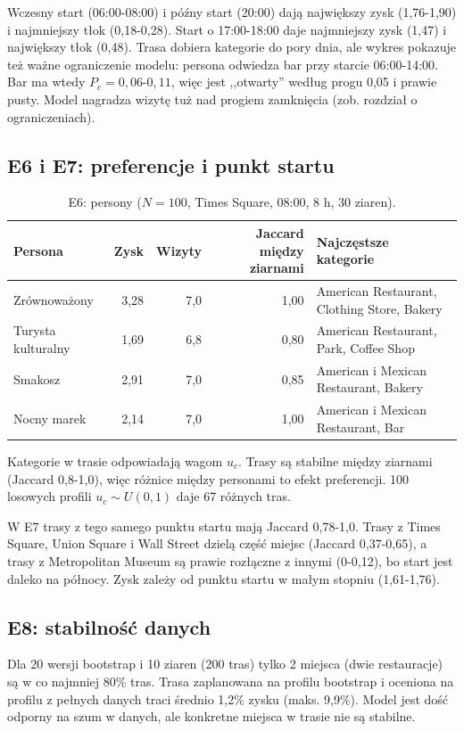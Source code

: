 \documentclass[11pt,a4paper]{article}
\begin{document}
Wczesny start (06:00-08:00) i późny start (20:00) dają największy zysk (1,76-1,90) i najmniejszy tłok (0,18-0,28). Start o 17:00-18:00 daje najmniejszy zysk (1,47) i największy tłok (0,48). Trasa dobiera kategorie do pory dnia, ale wykres pokazuje też ważne ograniczenie modelu: persona odwiedza bar przy starcie 06:00-14:00. Bar ma wtedy $P_c = 0{,}06$-$0{,}11$, więc jest ,,otwarty'' według progu 0,05 i prawie pusty. Model nagradza wizytę tuż nad progiem zamknięcia (zob. rozdział o ograniczeniach).

\subsection{E6 i E7: preferencje i punkt startu}

\begin{table}[h]
\centering
\caption{E6: persony ($N = 100$, Times Square, 08:00, 8 h, 30 ziaren).}
\begin{tabular}{lrrrl}
\toprule
Persona & Zysk & Wizyty & Jaccard między ziarnami & Najczęstsze kategorie \\
\midrule
Zrównoważony & 3,28 & 7,0 & 1,00 & American Restaurant, Clothing Store, Bakery \\
Turysta kulturalny & 1,69 & 6,8 & 0,80 & American Restaurant, Park, Coffee Shop \\
Smakosz & 2,91 & 7,0 & 0,85 & American i Mexican Restaurant, Bakery \\
Nocny marek & 2,14 & 7,0 & 1,00 & American i Mexican Restaurant, Bar \\
\bottomrule
\end{tabular}
\end{table}

Kategorie w trasie odpowiadają wagom $u_c$. Trasy są stabilne między ziarnami (Jaccard 0,8-1,0), więc różnice między personami to efekt preferencji. 100 losowych profili $u_c \sim U(0,1)$ daje 67 różnych tras.

W E7 trasy z tego samego punktu startu mają Jaccard 0,78-1,0. Trasy z Times Square, Union Square i Wall Street dzielą część miejsc (Jaccard 0,37-0,65), a trasy z Metropolitan Museum są prawie rozłączne z innymi (0-0,12), bo start jest daleko na północy. Zysk zależy od punktu startu w małym stopniu (1,61-1,76).

\subsection{E8: stabilność danych}

Dla 20 wersji bootstrap i 10 ziaren (200 tras) tylko 2 miejsca (dwie restauracje) są w co najmniej 80\% tras. Trasa zaplanowana na profilu bootstrap i oceniona na profilu z pełnych danych traci średnio 1,2\% zysku (maks. 9,9\%). Model jest dość odporny na szum w danych, ale konkretne miejsca w trasie nie są stabilne.
\end{document}
